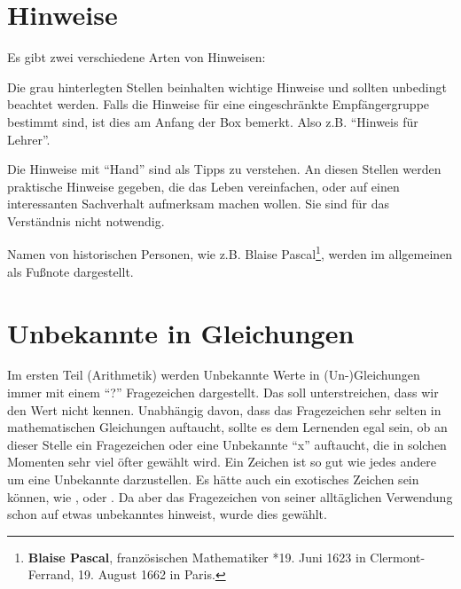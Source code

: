 \section{Hinweise}

Es gibt zwei verschiedene Arten von Hinweisen: 

\begin{fancyquotes}
Die grau hinterlegten Stellen beinhalten wichtige Hinweise und sollten unbedingt beachtet werden. Falls die Hinweise für eine eingeschränkte Empfängergruppe bestimmt sind, ist dies am Anfang der Box bemerkt. Also z.B. "`Hinweis für Lehrer"'. 
\end{fancyquotes}

\bigskip

\HandRight \qquad Die Hinweise mit "`Hand"' sind als Tipps zu verstehen. An diesen Stellen werden praktische Hinweise gegeben, die das Leben vereinfachen, oder auf einen interessanten Sachverhalt aufmerksam machen wollen. Sie sind für das Verständnis nicht notwendig. 

\bigskip

Namen von historischen Personen, wie z.B. Blaise Pascal\footnote{\textbf{Blaise Pascal}, französischen Mathematiker *19. Juni 1623 in Clermont-Ferrand, 19. August 1662 in Paris.}, werden im allgemeinen als Fußnote dargestellt. 


\section{Unbekannte in Gleichungen}

Im ersten Teil (Arithmetik) werden Unbekannte Werte in (Un-)Gleichungen immer mit einem "`?"' Fragezeichen dargestellt. Das soll unterstreichen, dass wir den Wert nicht kennen. Unabhängig davon, dass das Fragezeichen sehr selten in mathematischen Gleichungen auftaucht, sollte es dem Lernenden egal sein, ob an dieser Stelle ein Fragezeichen oder eine Unbekannte "`x"' auftaucht, die in solchen Momenten sehr viel öfter gewählt wird. Ein Zeichen ist so gut wie jedes andere um eine Unbekannte darzustellen. Es hätte auch ein exotisches Zeichen sein können, wie , oder . Da aber das Fragezeichen von seiner alltäglichen Verwendung schon auf etwas unbekanntes hinweist, wurde dies gewählt. 


